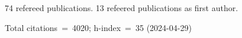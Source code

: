 74 refereed publications. 13 refeered publications as first author.

Total citations~=~4020; h-index~=~35 (2024-04-29)
